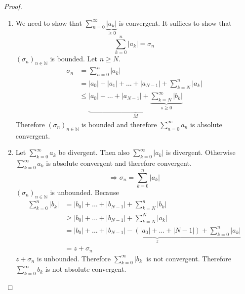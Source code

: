 \documentclass[a4paper,landscape,twocolumn]{article}
\theoremstyle{definition}
\newcommand\abs[1]{\left|#1\right|}
\newcommand\seq[1]{{\left(#1\right)}_{n \in \mathbb N}}
\begin{document}
\begin{proof}
  \begin{enumerate}
    \item
      We need to show that $\sum_{n=0}^\infty \underbrace{\abs{a_k}}_{\geq 0}$ is convergent.
      It suffices to show that
      \[ \sum_{k=0}^n \abs{a_k} = \sigma_n \]
      $\seq{\sigma_n}$ is bounded. Let $n \geq N$.
      \begin{align*}
        \sigma_n &= \sum_{n=0}^n \abs{a_k} \\
          &= \abs{a_0} + \abs{a_1} + \dots + \abs{a_{N-1}} + \sum_{k=N}^n \abs{a_k} \\
          &\leq \underbrace{\abs{a_0} + \dots + \abs{a_{N-1}} + \underbrace{\sum_{k=N}^\infty \abs{b_k}}_{s \geq 0}}_{M}
      \end{align*}
      Therefore $\seq{\sigma_n}$ is bounded and therefore $\sum_{n=0}^\infty a_n$ is absolute convergent.
    \item
      Let $\sum_{k=0}^\infty a_k$ be divergent. Then also $\sum_{k=0}^\infty \abs{a_k}$ is divergent.
      Otherwise $\sum_{k=0}^\infty a_k$ is absolute convergent and therefore convergent.
      \[ \Rightarrow \sigma_n = \sum_{k=0}^n \abs{a_k} \]
      $\seq{\sigma_n}$ is unbounded. Because
      \begin{align*}
        \sum_{k=0}^n \abs{b_k}
          &= \abs{b_0} + \dots + \abs{b_{N-1}} + \sum_{k=N}^n \abs{b_k} \\
          &\geq \abs{b_0} + \dots + \abs{b_{N-1}} + \sum_{k=N}^N \abs{a_k} \\
          &= \underbrace{\abs{b_0} + \dots + \abs{b_{N-1}} - \left(\abs{a_0} + \dots + \abs{N-1}\right) + \sum_{k=0}^n \abs{a_k}}_{z} \\
          &= z + \sigma_n
      \end{align*}
      $z + \sigma_n$ is unbounded. Therefore $\sum_{k=0}^\infty \abs{b_k}$ is not convergent.
      Therefore $\sum_{k=0}^\infty b_k$ is not absolute convergent.
  \end{enumerate}
\end{proof}
%
\end{document}
